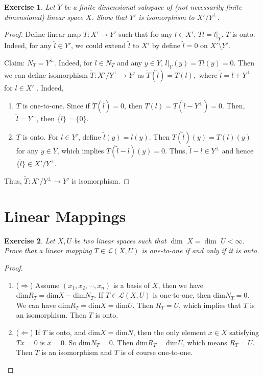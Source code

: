\documentclass[11pt]{book}
\newtheorem{exercise}{Exercise}[section]
\theoremstyle{definition}
\numberwithin{equation}{chapter}
\begin{document}
\begin{exercise} 
Let $Y$ be a finite dimensional subspace of (not necessarily finite dimensional) linear space $X$. Show that $Y'$ is isomorphism to $X'/Y^\bot${\rm \cite{12}}.
\end{exercise}
\begin{proof}
Define linear map $T: X' \to Y'$ such that for any $l \in X'$, $Tl = l|_Y$. $T$ is onto. Indeed, for any $\tilde{l} \in Y'$, we could extend $\tilde{l}$ to $X'$ by define $\tilde{l} = 0$ on $X'\setminus Y'$.

Claim: $N_T = Y^\bot$. Indeed, for $l \in N_T$ and any $y \in Y$, $l|_Y(y) = Tl(y) = 0$. Then we can define isomorphism $\widetilde{T}: X'/Y^\bot \to Y'$ as $\widetilde{T}(\tilde{l}) = T(l),$ where $\tilde{l} = l + Y^\bot$ for $l \in X'$ \cite{14}. Indeed, 
\begin{enumerate}[label=(\alph*)]
    \item $T$ is one-to-one. Since if $\widetilde{T}(\tilde{l}) = 0$, then $T(l) = T\left(\tilde{l} - Y^\bot\right) = 0$. Then, $\tilde{l} = Y^\bot$, then $\{\tilde{l}\} = \{0\}$.
    
    \item $T$ is onto. For $l \in Y'$, define $\tilde{l}(y) = l(y)$. Then $T(\tilde{l})(y) = T(l)(y)$ for any $y \in Y$, which implies $T(\tilde{l} - l)(y) = 0$. Thus, $\tilde{l} - l \in Y^\bot$ and hence $\{\tilde{l}\} \in X'/Y^\bot$.
\end{enumerate}
Thus, $\widetilde{T}: X'/Y^\bot \to Y'$ is isomorphism.
\end{proof}

\medskip

\section{Linear Mappings}
\begin{exercise}
Let $X,U$ be two linear spaces such that $ \dim \,\, X =  \dim \,\, U < \infty$. Prove that a linear mapping $T\in\mathscr{L}(X,U)$ is one-to-one if and only if it is onto.
\end{exercise}
\begin{proof}
~\begin{enumerate}[label=(\arabic*)]
    \item ($\Rightarrow$) Assume $(x_1, x_2, \cdots, x_n)$ is a basis of $X$, then we have
    $\text{dim} R_T = \text{dim} X - \text{dim} N_T$. If $T\in \mathscr{L}(X,U)$ is one-to-one, then $\text{dim} N_T = 0$. We can have 
    $\text{dim} R_T = \text{dim} X = \text{dim} U$. Then $R_T = U$, which implies that $T$ is an isomorphism. Then $T$ is onto.
    \item ($\Leftarrow$) If $T$ is onto, and $\text{dim} X = \text{dim} N$, then the only element $x\in X$ satisfying $Tx = 0$ is $x = 0$. So $\text{dim} N_T = 0$. Then $\text{dim} R_T = \text{dim} U$, which means $R_T = U$. Then $T$ is an isomorphism and $T$ is of course one-to-one.
\end{enumerate}
\end{proof}
\end{document}
